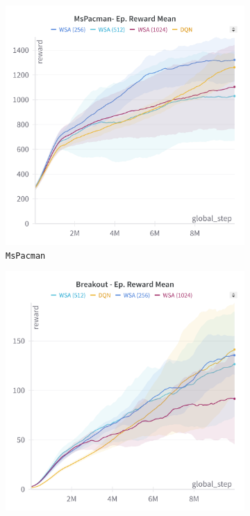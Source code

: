 \begin{figure}[htbp]
    \centering
    \begin{subfigure}[b]{0.45\textwidth}
        \centering
        \includegraphics[width=\textwidth]{images/mspacman_dqn}
        \caption{\texttt{MsPacman}}
        \label{fig:mspacman_dqn}
    \end{subfigure}
    \hfill
    \begin{subfigure}[b]{0.45\textwidth}
        \centering
        \includegraphics[width=\textwidth]{images/breakout_dqn}

\end{subfigure}
\end{figure}
